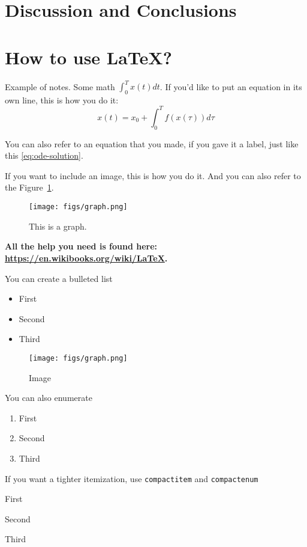 \documentclass{amsart}
\begin{document}
\section{Discussion and Conclusions}




\appendix

\section{How to use LaTeX?}

Example of notes. Some math $\int_0^Tx(t)dt$. If you'd like to put an equation in its own line, this is how you do it:
\begin{equation}
x(t) = x_0 + \int_0^T f(x(\tau))d\tau  \label{eq:ode-solution}
\end{equation}


You can also refer to an equation that you made, if you gave it a label, just like this \eqref{eq:ode-solution}.

If you want to include an image, this is how you do it. And you can also refer to the Figure~\ref{fig:graph}.
\begin{figure}
  \centering
  \texttt{[image: figs/graph.png]}
  \caption{This is a graph.}\label{fig:graph}
\end{figure}

\textbf{  All the help you need is found here: \url{https://en.wikibooks.org/wiki/LaTeX}. }


You can create a bulleted list
\begin{itemize}
\item First
\item Second
\item Third
\end{itemize}


\begin{figure}
  \texttt{[image: figs/graph.png]}
  \caption{Image}
\end{figure}
You can also enumerate
\begin{enumerate}
\item First
\item Second
\item Third
\end{enumerate}

If you want a tighter itemization, use \verb|compactitem| and \verb|compactenum|
\begin{compactitem}
\item First
\item Second
\item Third
\end{compactitem}
\end{document}
